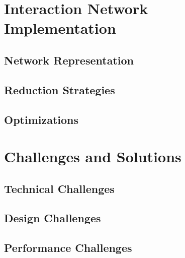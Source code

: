 \section{Interaction Network Implementation}

\subsection{Network Representation}

\subsection{Reduction Strategies}

\subsection{Optimizations}

\section{Challenges and Solutions}

\subsection{Technical Challenges}

\subsection{Design Challenges}

\subsection{Performance Challenges} 